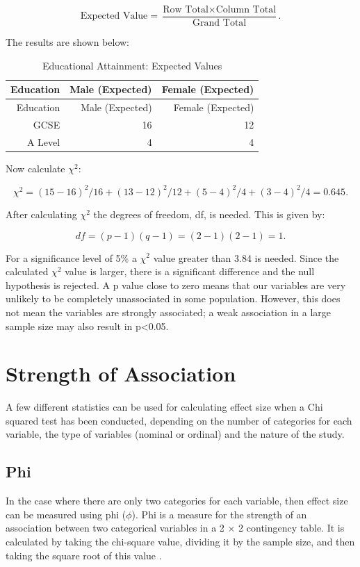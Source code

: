 \documentclass[
]{book}
\begin{document}
\[\textrm{Expected Value}= \frac{\textrm{Row Total} \times \textrm{Column Total}}{\textrm{Grand Total}}.\]

The results are shown below:

\begin{longtable}[]{@{}rrr@{}}
\caption{\label{tab:table13} Educational Attainment: Expected Values}\tabularnewline
\toprule
Education & Male (Expected) & Female (Expected) \\
\midrule
\endfirsthead
\toprule
Education & Male (Expected) & Female (Expected) \\
\midrule
\endhead
GCSE & 16 & 12 \\
A Level & 4 & 4 \\
\bottomrule
\end{longtable}

Now calculate \(\chi^2\):

\[\chi^2=(15-16)^2/16 +(13-12)^2/12+(5-4)^2/4 + (3-4)^2/4 = 0.645.\]

After calculating \(\chi^2\) the degrees of freedom, df, is needed. This is given by:

\[df=(p-1)(q-1)=(2-1)(2-1)=1.\]

For a significance level of 5\% a \(\chi^2\) value greater than 3.84 is needed. Since the calculated \(\chi^2\) value is larger, there is a significant difference and the null hypothesis is rejected. A p value close to zero means that our variables are very unlikely to be completely unassociated in some population. However, this does not mean the variables are strongly associated; a weak association in a large sample size may also result in p\textless0.05.

\hypertarget{strength-of-association}{%
\section{Strength of Association}\label{strength-of-association}}

A few different statistics can be used for calculating effect size when a Chi squared test has been conducted, depending on the number of categories for each variable, the type of variables (nominal or ordinal) and the nature of the study.

\hypertarget{phi}{%
\subsection{Phi}\label{phi}}

In the case where there are only two categories for each variable, then effect size can be measured using phi (\(\phi\)). Phi is a measure for the strength of an association between two categorical variables in a 2 \(\times\) 2 contingency table. It is calculated by taking the chi-square value, dividing it by the sample size, and then taking the square root of this value \citep{akoglu}.
\end{document}

